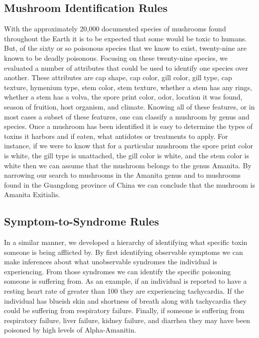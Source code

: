 \documentclass[12pt, conference, compsocconf]{IEEEtran}
\begin{document}
\subsection{Mushroom Identification Rules}
With the approximately 20,000 documented species of mushrooms found throughout the Earth it is to be expected that some would be toxic to humans. But, of the sixty or so poisonous species that we know to exist, twenty-nine are known to be deadly poisonous. 
Focusing on these twenty-nine species, we evaluated a number of attributes that could be used to identify one species over another. These attributes are cap shape, cap color, gill color, gill type, cap texture, hymenium type, stem color, stem texture, whether a stem has any rings, whether a stem has a volva, the spore print color, odor, location it was found, season of fruition, host organism, and climate. 
Knowing all of these features, or in most cases a subset of these features, one can classify a mushroom by genus and species. Once a mushroom has been identified it is easy to determine the types of toxins it harbors and if eaten, what antidotes or treatments to apply. 
For instance, if we were to know that for a particular mushroom the spore print color is white, the gill type is unattached, the gill color is white, and the stem color is white then we can assume that the mushroom belongs to the genus Amanita. 
By narrowing our search to mushrooms in the Amanita genus and to mushrooms found in the Guangdong province of China we can conclude that the mushroom is Amanita Exitialis.

\subsection{Symptom-to-Syndrome Rules}
In a similar manner, we developed a hierarchy of identifying what specific toxin someone is being afflicted by. 
By first identifying observable symptoms we can make inferences about what unobservable syndromes the individual is experiencing. From those syndromes we can identify the specific poisoning someone is suffering from.
As an example, if an individual is reported to have a resting heart rate of greater than 100 they are experiencing tachycardia. If the individual has blueish skin and shortness of breath along with tachycardia they could be suffering from respiratory failure. 
Finally, if someone is suffering from respiratory failure, liver failure, kidney failure, and diarrhea they may have been poisoned by high levels of Alpha-Amanitin. 
\end{document}
